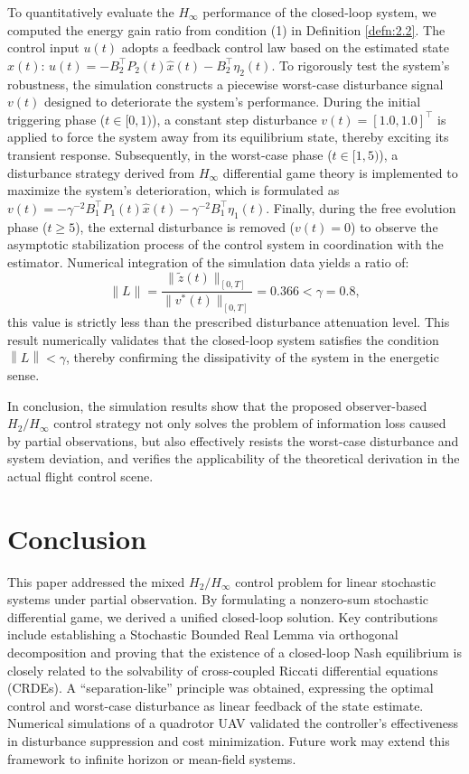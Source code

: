 \documentclass[lettersize,journal]{IEEEtran}
\theoremstyle{plain}
\theoremstyle{definition}
\begin{document}
To quantitatively evaluate the $H_\infty$ performance of the closed-loop system, we computed the energy gain ratio from condition (1) in Definition \ref{defn:2.2}. The control input \( u(t) \) adopts a feedback control law based on the estimated state \( \widehat{x}(t) \):
\(
u(t) = -B_2^{\top} P_2(t) \widehat{x}(t) - B_2^{\top}\eta_2(t).
\)
To rigorously test the system's robustness, the simulation constructs a piecewise worst-case disturbance signal $v(t)$ designed to deteriorate the system's performance. During the initial triggering phase ($t \in [0, 1)$), a constant step disturbance $v(t) = [1.0, 1.0]^\top$ is applied to force the system away from its equilibrium state, thereby exciting its transient response. Subsequently, in the worst-case phase ($t \in [1, 5)$), a disturbance strategy derived from $H_\infty$ differential game theory is implemented to maximize the system's deterioration, which is formulated as
\(v(t) = -\gamma^{-2} B_1^\top P_1(t) \widehat{x}(t) -\gamma^{-2}B_1^{\top}\eta_1(t)\).
Finally, during the free evolution phase ($t \ge 5$), the external disturbance is removed ($v(t) = 0$) to observe the asymptotic stabilization process of the control system in coordination with the estimator. Numerical integration of the simulation data yields a ratio of:
\begin{equation*}
	\|L\| = \frac{\|\widetilde{z}(t)\|_{[0,T]}}{\|v^*(t)\|_{[0,T]}} = 0.366 < \gamma = 0.8,
\end{equation*}
this value is strictly less than the prescribed disturbance attenuation level. This result numerically validates that the closed-loop system satisfies the condition $\left\|L\right\| < \gamma$, thereby confirming the dissipativity of the system in the energetic sense.

In conclusion, the simulation results show that the proposed observer-based $H_2/H_\infty$ control strategy not only solves the problem of information loss caused by partial observations, but also effectively resists the worst-case disturbance and system deviation, and verifies the applicability of the theoretical derivation in the actual flight control scene.

\section{Conclusion}\label{sec7}
This paper addressed the mixed $H_{2}/H_{\infty}$ control problem for linear stochastic systems under partial observation. By formulating a nonzero-sum stochastic differential game, we derived a unified closed-loop solution. Key contributions include establishing a Stochastic Bounded Real Lemma via orthogonal decomposition and proving that the existence of a closed-loop Nash equilibrium is closely related to the solvability of cross-coupled Riccati differential equations (CRDEs). A ``separation-like'' principle was obtained, expressing the optimal control and worst-case disturbance as linear feedback of the state estimate. Numerical simulations of a quadrotor UAV validated the controller's effectiveness in disturbance suppression and cost minimization. Future work may extend this framework to infinite horizon or mean-field systems.
\end{document}
